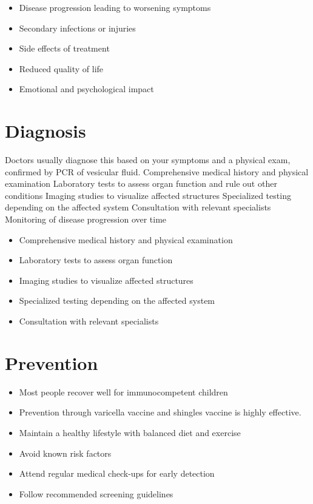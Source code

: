 \begin{itemize}[noitemsep]
  \item Disease progression leading to worsening symptoms
  \item Secondary infections or injuries
  \item Side effects of treatment
  \item Reduced quality of life
  \item Emotional and psychological impact
\end{itemize}
\section{Diagnosis}
Doctors usually diagnose this based on your symptoms and a physical exam, confirmed by PCR of vesicular fluid. Comprehensive medical history and physical examination Laboratory tests to assess organ function and rule out other conditions Imaging studies to visualize affected structures Specialized testing depending on the affected system Consultation with relevant specialists Monitoring of disease progression over time

\begin{itemize}[noitemsep]
  \item Comprehensive medical history and physical examination
  \item Laboratory tests to assess organ function
  \item Imaging studies to visualize affected structures
  \item Specialized testing depending on the affected system
  \item Consultation with relevant specialists
\end{itemize}
\section{Prevention}
\begin{itemize}[noitemsep]
  \item Most people recover well for immunocompetent children
  \item Prevention through varicella vaccine and shingles vaccine is highly effective.
  \item Maintain a healthy lifestyle with balanced diet and exercise
  \item Avoid known risk factors
  \item Attend regular medical check-ups for early detection
  \item Follow recommended screening guidelines
\end{itemize}
